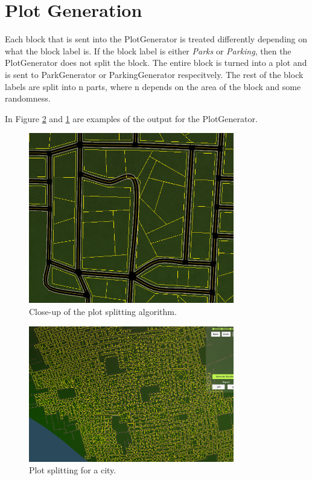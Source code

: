 \section{Plot Generation}
Each block that is sent into the PlotGenerator is treated differently depending on what the block label is. 
If the block label is either \textit{Parks} or \textit{Parking}, then the PlotGenerator does not split the block. 
The entire block is turned into a plot and is sent to ParkGenerator or ParkingGenerator respecitvely.
The rest of the block labels are split into n parts, where n depends on the area of the block and some randomness. 

In Figure \ref{fig:plot} and \ref{fig:plot2} are examples of the output for the PlotGenerator.

\begin{figure}[H]
  \centering

  \includegraphics[width=0.8\textwidth]{figure/plot2.png}
  \caption{Close-up of the plot splitting algorithm.}

  \label{fig:plot2}
\end{figure}

\begin{figure}[H]
  \centering

  \includegraphics[width=0.8\textwidth]{figure/plot.png}
  \caption{Plot splitting for a city.}

  \label{fig:plot}
\end{figure}

